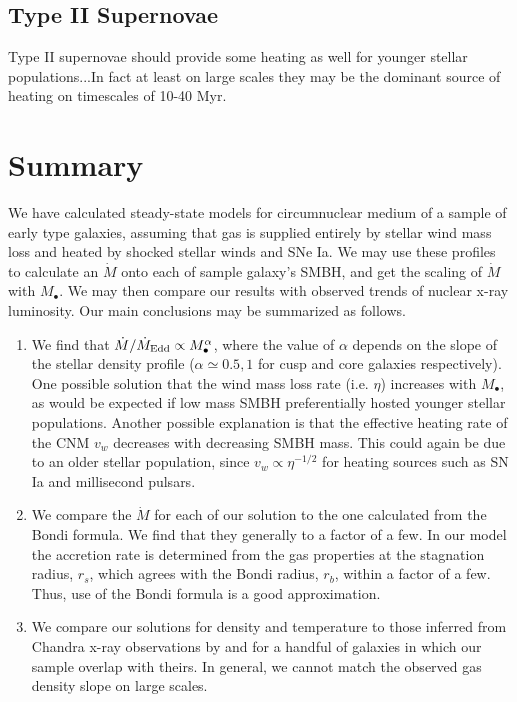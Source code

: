 \documentclass[usenatbib,fleqn]{mn2e}
\newcommand{\Mdot}{\dot{M}}
\newcommand{\eddr}{\dot{M}/\dot{M}_{\rm Edd}}
\newcommand{\rs}{r_s}
\newcommand{\rb}{r_b}
\newcommand{\Mbh}[1][]{M_{\bullet#1}}
\begin{document}
\subsection{Type II Supernovae}
Type II supernovae should provide some heating as well for younger
stellar populations...In fact at least on large scales they may be the
dominant source of heating on timescales of 10-40 Myr. 
  

  \section{Summary}
  \label{sec:summary}
  We have calculated steady-state models for circumnuclear medium of a
  sample of early type galaxies, assuming that gas is supplied
  entirely by stellar wind mass loss and heated by shocked stellar
  winds and SNe Ia. We may use these profiles to calculate an $\Mdot$
  onto each of sample galaxy's SMBH, and get the scaling of $\Mdot$
  with $\Mbh$. We may then compare our results with observed trends of
  nuclear x-ray luminosity. Our main conclusions may be summarized as
  follows.

  \begin{enumerate}
  \item We find that $\eddr \propto \Mbh^{\alpha}$, where the value of
    $\alpha$ depends on the slope of the stellar density profile
    ($\alpha\simeq0.5,1$ for cusp and core galaxies respectively). One
    possible solution that the wind mass loss rate (i.e. $\eta$)
    increases with $\Mbh$, as would be expected if low mass SMBH
    preferentially hosted younger stellar populations. Another possible
    explanation is that the effective heating rate of the CNM $v_{w}$
    decreases with decreasing SMBH mass. This could again be due to an
    older stellar population, since $v_{w} \propto \eta^{−1/2}$
    for heating sources such as SN Ia and millisecond pulsars.
  \item We compare the $\Mdot$ for each of our solution to the one
    calculated from the Bondi formula. We find that they generally to
    a factor of a few. In our model the accretion rate is determined
    from the gas properties at the stagnation radius, $\rs$, which
    agrees with the Bondi radius, $\rb$, within a factor of a
    few. Thus, use of the Bondi formula is a good approximation.
  \item We compare our solutions for density and temperature to those
    inferred from Chandra x-ray observations by \citet{AllenDunn+:2006a}
    and \citet{RussellMcNamara+:2013a} for a handful of galaxies in
    which our sample overlap with theirs. In general, we cannot match
    the observed gas density slope on large scales. 
  \end{enumerate}
  
\end{document}
